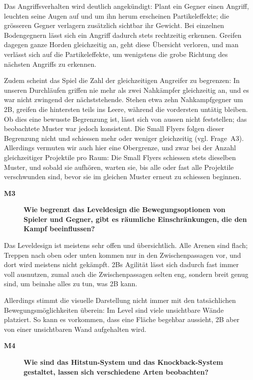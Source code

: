 \documentclass[../Main.tex]{subfiles}
\begin{document}
Das Angriffsverhalten wird deutlich angekündigt: Plant ein Gegner einen Angriff, leuchten seine Augen auf und um ihn herum erscheinen Partikeleffekte; die grösseren Gegner verlagern zusätzlich sichtbar ihr Gewicht. Bei einzelnen Bodengegnern lässt sich ein Angriff dadurch stets rechtzeitig erkennen. Greifen dagegen ganze Horden gleichzeitig an, geht diese Übersicht verloren, und man verlässt sich auf die Partikeleffekte, um wenigstens die grobe Richtung des nächsten Angriffs zu erkennen.

Zudem scheint das Spiel die Zahl der gleichzeitigen Angreifer zu begrenzen: In unseren Durchläufen griffen nie mehr als zwei Nahkämpfer gleichzeitig an, und es war nicht zwingend der nächststehende. Stehen etwa zehn Nahkampfgegner um 2B, greifen die hintersten teils ins Leere, während die vordersten untätig bleiben. Ob dies eine bewusste Begrenzung ist, lässt sich von aussen nicht feststellen; das beobachtete Muster war jedoch konsistent. Die Small Flyers folgen dieser Begrenzung nicht und schiessen mehr oder weniger gleichzeitig (vgl. Frage~A3). Allerdings vermuten wir auch hier eine Obergrenze, und zwar bei der Anzahl gleichzeitiger Projektile pro Raum: Die Small Flyers schiessen stets dieselben Muster, und sobald sie aufhören, warten sie, bis alle oder fast alle Projektile verschwunden sind, bevor sie im gleichen Muster erneut zu schiessen beginnen.

\begin{description}
    \item[\textbf{M3}] \textbf{Wie begrenzt das Leveldesign die Bewegungsoptionen von Spieler und Gegner, gibt es räumliche Einschränkungen, die den Kampf beeinflussen?}
\end{description}

Das Leveldesign ist meistens sehr offen und übersichtlich. Alle Arenen sind flach; Treppen nach oben oder unten kommen nur in den Zwischenpassagen vor, und dort wird meistens nicht gekämpft. 2Bs Agilität lässt sich dadurch fast immer voll ausnutzen, zumal auch die Zwischenpassagen selten eng, sondern breit genug sind, um beinahe alles zu tun, was 2B kann.

Allerdings stimmt die visuelle Darstellung nicht immer mit den tatsächlichen Bewegungsmöglichkeiten überein: Im Level sind viele unsichtbare Wände platziert. So kann es vorkommen, dass eine Fläche begehbar aussieht, 2B aber von einer unsichtbaren Wand aufgehalten wird.

\begin{description}
    \item[\textbf{M4}] \textbf{Wie sind das Hitstun-System und das Knockback-System gestaltet, lassen sich verschiedene Arten beobachten?}
\end{description}
\end{document}
